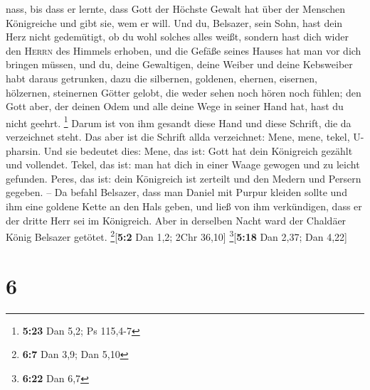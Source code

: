 nass, bis dass er lernte, dass Gott der Höchste Gewalt hat über der
Menschen Königreiche und gibt sie, wem er will.  Und du,
Belsazer, sein Sohn, hast dein Herz nicht gedemütigt, ob du wohl solches
alles weißt,  sondern hast dich wider den \textsc{Herrn}
des Himmels erhoben, und die Gefäße seines Hauses hat man vor dich
bringen müssen, und du, deine Gewaltigen, deine Weiber und deine
Kebsweiber habt daraus getrunken, dazu die silbernen, goldenen, ehernen,
eisernen, hölzernen, steinernen Götter gelobt, die weder sehen noch
hören noch fühlen; den Gott aber, der deinen Odem und alle deine Wege in
seiner Hand hat, hast du nicht geehrt. \footnote{\textbf{5:23} Dan 5,2;
  Ps 115,4-7}  Darum ist von ihm gesandt diese Hand und
diese Schrift, die da verzeichnet steht.  Das aber ist
die Schrift allda verzeichnet: Mene, mene, tekel, U-pharsin.
 Und sie bedeutet dies: Mene, das ist: Gott hat dein
Königreich gezählt und vollendet.  Tekel, das ist: man
hat dich in einer Waage gewogen und zu leicht gefunden. 
Peres, das ist: dein Königreich ist zerteilt und den Medern und Persern
gegeben. --  Da befahl Belsazer, dass man Daniel mit
Purpur kleiden sollte und ihm eine goldene Kette an den Hals geben, und
ließ von ihm verkündigen, dass er der dritte Herr sei im Königreich.
 Aber in derselben Nacht ward der Chaldäer König Belsazer
getötet. \footnote{\textbf{6:7} Dan 3,9; Dan 5,10}{[}\textbf{5:2} Dan
1,2; 2Chr 36,10{]} \footnote{\textbf{6:22} Dan 6,7}{[}\textbf{5:18} Dan
2,37; Dan 4,22{]}

\hypertarget{section-5}{%
\section{6}\label{section-5}}

